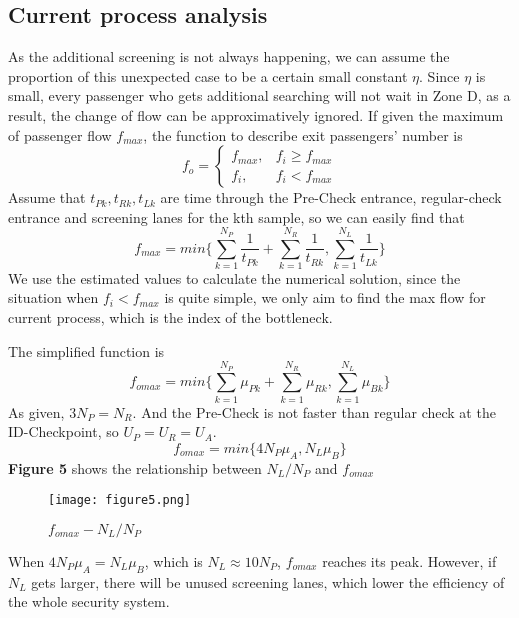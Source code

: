 \documentclass{mcmthesis}
\begin{document}
\subsection{Current process analysis}
As the additional screening is not always happening, we can assume the proportion of this unexpected case to be a certain small constant $\eta$. Since $\eta$ is small, every passenger who gets additional searching will not wait in Zone D, as a result, the change of flow can be approximatively ignored. If given the maximum of passenger flow $f_{max}$, the function to describe exit passengers' number is
\begin{equation}
    f_{o}=
   \begin{cases}
   f_{max}, &\mbox{$f_i \geq f_{max}$}\\
   f_i, &\mbox{$f_i < f_{max}$}
   \end{cases}
\end{equation}
Assume that $t_{Pk}, t_{Rk}, t_{Lk}$ are time through the Pre-Check entrance, regular-check entrance and screening lanes for the kth sample, so we can easily find that 
$$f_{max}=min\{\sum_{k=1}^{N_P}\frac{1}{t_{Pk}}+\sum_{k=1}^{N_R}\frac{1}{t_{Rk}},\sum_{k=1}^{N_L}\frac{1}{t_{Lk}}\}$$
We use the estimated values to calculate the numerical solution, since the situation when $f_i<f_{max}$ is quite simple, we only aim to find the max flow for current process, which is the index of the bottleneck.

The simplified function is
$$f_{o max}= min\{\sum_{k=1}^{N_P}\mu_{Pk}+\sum_{k=1}^{N_R}\mu_{Rk},\sum_{k=1}^{N_L}\mu_{Bk}\}$$
As given, $3N_P=N_R$. And the Pre-Check is not faster than regular check at the ID-Checkpoint, so $U_P=U_R=U_A$.
$$f_{o max}= min\{4N_P\mu_A,N_L\mu_B\}$$
\textbf{Figure 5} shows the relationship between $N_L/N_P$ and $f_{omax}$

\begin{figure}[H]
\small
\centering
\texttt{[image: figure5.png]}
\caption{$f_{omax}-N_L/N_P$} \label{fig:$f_{omax}-N_L/N_P$}
\end{figure}
\noindent When $4N_P\mu_A=N_L\mu_B$, which is $N_L\approx10N_P$, $f_{omax}$ reaches its peak. However, if $N_L$ gets larger, there will be unused screening lanes, which lower the efficiency of the whole security system.
\end{document}
